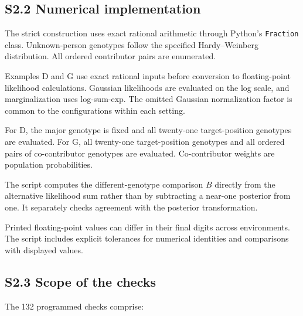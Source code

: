 \documentclass[
]{article}
\begin{document}
\subsection{S2.2 Numerical
implementation}\label{s2.2-numerical-implementation}

The strict construction uses exact rational arithmetic through Python's
\texttt{Fraction} class. Unknown-person genotypes follow the specified
Hardy--Weinberg distribution. All ordered contributor pairs are
enumerated.

Examples D and G use exact rational inputs before conversion to
floating-point likelihood calculations. Gaussian likelihoods are
evaluated on the log scale, and marginalization uses log-sum-exp. The
omitted Gaussian normalization factor is common to the configurations
within each setting.

For D, the major genotype is fixed and all twenty-one target-position
genotypes are evaluated. For G, all twenty-one target-position genotypes
and all ordered pairs of co-contributor genotypes are evaluated.
Co-contributor weights are population probabilities.

The script computes the different-genotype comparison \(B\) directly
from the alternative likelihood sum rather than by subtracting a
near-one posterior from one. It separately checks agreement with the
posterior transformation.

Printed floating-point values can differ in their final digits across
environments. The script includes explicit tolerances for numerical
identities and comparisons with displayed values.

\subsection{S2.3 Scope of the checks}\label{s2.3-scope-of-the-checks}

The 132 programmed checks comprise:
\end{document}
